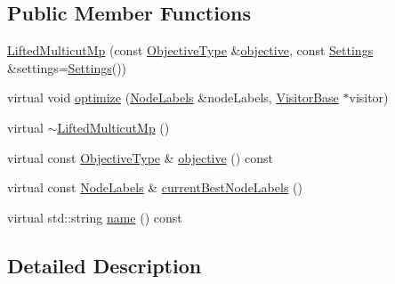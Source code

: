 \subsection*{Public Member Functions}
\begin{DoxyCompactItemize}
\item 
\hyperlink{classnifty_1_1graph_1_1lifted__multicut_1_1LiftedMulticutMp_a70e3a9362dd9c4abc2058467b10468da}{Lifted\+Multicut\+Mp} (const \hyperlink{classnifty_1_1graph_1_1lifted__multicut_1_1LiftedMulticutMp_acce0234d990c40af0002f39dd7e309b7}{Objective\+Type} \&\hyperlink{classnifty_1_1graph_1_1lifted__multicut_1_1LiftedMulticutMp_a8caa8ecb085520cab62a7b2a43edf2d2}{objective}, const \hyperlink{structnifty_1_1graph_1_1lifted__multicut_1_1LiftedMulticutMp_1_1Settings}{Settings} \&settings=\hyperlink{structnifty_1_1graph_1_1lifted__multicut_1_1LiftedMulticutMp_1_1Settings}{Settings}())
\item 
virtual void \hyperlink{classnifty_1_1graph_1_1lifted__multicut_1_1LiftedMulticutMp_a25228d3aae9ba9d0fc5630b83bf4f8e4}{optimize} (\hyperlink{classnifty_1_1graph_1_1lifted__multicut_1_1LiftedMulticutMp_af6da41df53a36b0b01a57035eed36121}{Node\+Labels} \&node\+Labels, \hyperlink{classnifty_1_1graph_1_1lifted__multicut_1_1LiftedMulticutMp_aa05a3ad0bdbbfa76ffc49f3bda58d578}{Visitor\+Base} $\ast$visitor)
\item 
virtual \hyperlink{classnifty_1_1graph_1_1lifted__multicut_1_1LiftedMulticutMp_a0256928abff187892aa6c0fb04b8328e}{$\sim$\+Lifted\+Multicut\+Mp} ()
\item 
virtual const \hyperlink{classnifty_1_1graph_1_1lifted__multicut_1_1LiftedMulticutMp_acce0234d990c40af0002f39dd7e309b7}{Objective\+Type} \& \hyperlink{classnifty_1_1graph_1_1lifted__multicut_1_1LiftedMulticutMp_a8caa8ecb085520cab62a7b2a43edf2d2}{objective} () const 
\item 
virtual const \hyperlink{classnifty_1_1graph_1_1lifted__multicut_1_1LiftedMulticutMp_af6da41df53a36b0b01a57035eed36121}{Node\+Labels} \& \hyperlink{classnifty_1_1graph_1_1lifted__multicut_1_1LiftedMulticutMp_a3a0f3c251180a16654b02471d4acff9b}{current\+Best\+Node\+Labels} ()
\item 
virtual std\+::string \hyperlink{classnifty_1_1graph_1_1lifted__multicut_1_1LiftedMulticutMp_a3d4cd89f1f2064c0433b31d018e0d2b7}{name} () const 
\end{DoxyCompactItemize}


\subsection{Detailed Description}

